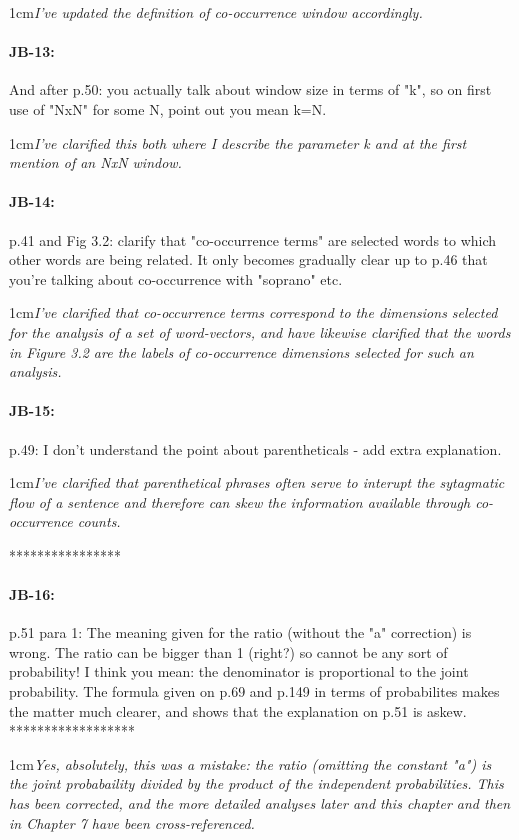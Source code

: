 \documentclass[11pt,a4paper]{article}
\newcommand{\res}[1]{\vspace{0.25cm} \begin{adjustwidth}{1cm}{}\emph{#1}\end{adjustwidth}}
\begin{document}
\res{I've updated the definition of co-occurrence window accordingly.}

\paragraph{JB-13:} And after p.50: you actually talk about window size in terms of "k", so on first use of "NxN" for some N, point out you mean k=N.

\res{I've clarified this both where I describe the parameter k and at the first mention of an NxN window.}

\paragraph{JB-14:} p.41 and Fig 3.2: clarify that "co-occurrence terms" are selected words to which other words are being related. It only becomes gradually clear up to p.46 that you're talking about co-occurrence with "soprano" etc.

\res{I've clarified that co-occurrence terms correspond to the dimensions selected for the analysis of a set of word-vectors, and have likewise clarified that the words in Figure 3.2 are the labels of co-occurrence dimensions selected for such an analysis.}

\paragraph{JB-15:} p.49: I don't understand the point about parentheticals - add extra explanation.

\res{I've clarified that parenthetical phrases often serve to interupt the sytagmatic flow of a sentence and therefore can skew the information available through co-occurrence counts.}

****************
\paragraph{JB-16:} p.51 para 1: The meaning given for the ratio (without the "a" correction) is wrong. The ratio can be bigger than 1 (right?) so cannot be any sort of probability! I think you mean: the denominator is proportional to the joint probability. The formula given on p.69 and p.149 in terms of probabilites makes the matter much clearer, and shows that the explanation on p.51 is askew.
******************

\res{Yes, absolutely, this was a mistake: the ratio (omitting the constant "a") is the joint probabaility divided by the product of the independent probabilities.  This has been corrected, and the more detailed analyses later and this chapter and then in Chapter 7 have been cross-referenced.}
\end{document}
